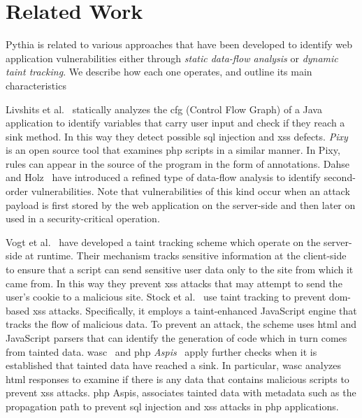 \section{Related Work}
\label{sec:rel}

Pythia is related to
various approaches that
have been developed to identify web 
application vulnerabilities
either through {\it static data-flow
analysis} or {\it dynamic taint tracking}.
We describe how each one operates,
and outline its main characteristics

Livshits et al.~\cite{LL05}
statically analyzes the {\sc cfg}
(Control Flow Graph) of a Java application
to identify variables
that carry user input and check if
they reach a sink method.
In this way they detect
possible {\sc sql} injection and
{\sc xss} defects.
{\it Pixy}~\cite{JKK06} is an open source tool that examines {\sc php} scripts
in a similar manner.
In Pixy,
rules can appear in the source of the
program in the form of annotations.
Dahse and Holz~\cite{DH14} have introduced a
refined type of data-flow analysis to
identify second-order vulnerabilities.
Note that vulnerabilities of this kind
occur when an attack payload
is first stored by the web application
on the server-side and then later on used
in a security-critical operation.

Vogt et al.~\cite{VFJKKV07} have
developed a taint tracking scheme
which operate on the server-side at runtime.
Their mechanism tracks sensitive
information at the client-side
to ensure that a script can send
sensitive user data only to the
site from which it came from.
In this way they prevent {\sc xss}
attacks that may attempt to send
the user's cookie to a malicious site.
Stock et al.~\cite{SLMS14} use
taint tracking to prevent
{\sc dom}-based {\sc xss} attacks.
Specifically, it employs a taint-enhanced JavaScript engine that
tracks the flow of malicious data.
To prevent an attack,
the scheme uses {\sc html} and JavaScript
parsers that can identify the generation of code which in turn comes from tainted data.
{\sc wasc}~\cite{NLC07} and
{\sc php} {\it Aspis}~\cite{PMP11}
apply further checks when it is
established that tainted data have
reached a sink.
In particular,
{\sc wasc} analyzes {\sc html}
responses to examine
if there is any data that contains malicious
scripts to prevent {\sc xss} attacks.
{\sc php} Aspis,
associates tainted data with metadata
such as the propagation path to
prevent {\sc sql} injection and
{\sc xss} attacks in {\sc php} applications.

